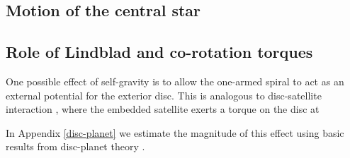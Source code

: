 

{\bf
  \subsection{Motion of the central star} 
  
  \subsection{Role of Lindblad and co-rotation torques}
  One possible effect of self-gravity is to allow the one-armed spiral  
  to act as an external potential for the exterior disc. This is
  analogous to disc-satellite interaction 
  \citep{goldreich79}, where the embedded satellite exerts a torque on
  the disc at 



In Appendix \ref{disc-planet} we estimate the magnitude of this effect
  using basic results from disc-planet theory \citep[see, e.g.][and
  references therein]{papaloizou07}.  
  

}























